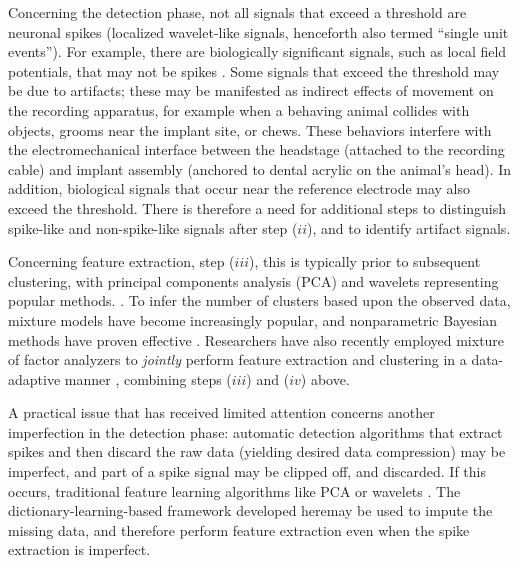 \documentclass[journal]{IEEEtran}
\begin{document}
Concerning the detection phase, not all signals that exceed a threshold are neuronal spikes (localized wavelet-like signals, henceforth also termed ``single unit events''). For example, there are biologically significant signals, such as local field potentials, that may not be spikes \cite{Donoghue07}. Some signals that exceed the threshold may be due to artifacts; these may be manifested as indirect effects of movement on the recording apparatus, for example when a behaving animal collides with objects, grooms near the implant site, or chews. These behaviors interfere with the electromechanical interface between the headstage (attached to the recording cable) and implant assembly
(anchored to dental acrylic on the animal's head).  In addition, biological signals that occur near the reference electrode may also exceed the threshold.  There is therefore a need for additional steps to distinguish spike-like and non-spike-like signals after step ($ii$), and to identify artifact signals.

Concerning feature extraction, step ($iii$), this is typically  prior to subsequent clustering, with principal components analysis (PCA) \cite{Lewicki} and wavelets \cite{Letelier2000} representing popular methods. 
 \cite{candes2011robust}. To infer the number of clusters based upon the observed data, mixture models have become increasingly popular, and nonparametric Bayesian methods have proven effective \cite{Wood2009,Bo2011}. Researchers have also recently employed mixture of factor analyzers to \emph{jointly} perform feature extraction and clustering in a data-adaptive manner \cite{Dilan,Bo2011}, combining steps ($iii$) and ($iv$) above.

A practical issue that has received limited attention concerns another imperfection in the detection phase: automatic detection algorithms that extract spikes and then discard the raw data (yielding desired data compression) may be imperfect, and part of a spike signal may be clipped off, and discarded. If this occurs, traditional feature learning algorithms like PCA or wavelets . The dictionary-learning-based framework developed heremay be used to impute the missing data, and therefore perform feature extraction even when the spike extraction is imperfect.
\end{document}
